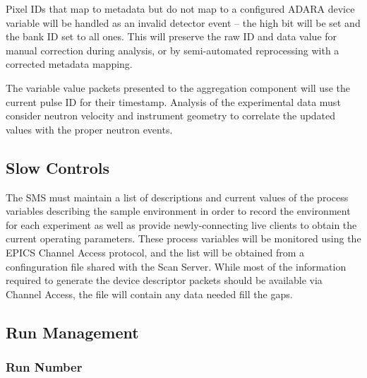 Pixel IDs that map to metadata but do not map to a configured ADARA device
variable will be handled as an invalid detector event -- the high bit will
be set and the bank ID set to all ones. This will preserve the raw ID and
data value for manual correction during analysis, or by semi-automated
reprocessing with a corrected metadata mapping.

The variable value packets presented to the aggregation component will
use the current pulse ID for their timestamp. Analysis of the experimental
data must consider neutron velocity and instrument geometry to correlate the
updated values with the proper neutron events.


\subsection{Slow Controls}

The SMS must maintain a list of descriptions and current values of the process
variables describing the sample environment in order to record the environment
for each experiment as well as provide newly-connecting live clients to obtain
the current operating parameters. These process variables will be monitored
using the EPICS Channel Access protocol, and the list will be obtained from a
confinguration file shared with the Scan Server. While most of the information
required to generate the device descriptor packets should be available
via Channel Access, the file will contain any data needed fill the gaps.


\subsection{Run Management}

\subsubsection{Run Number}

